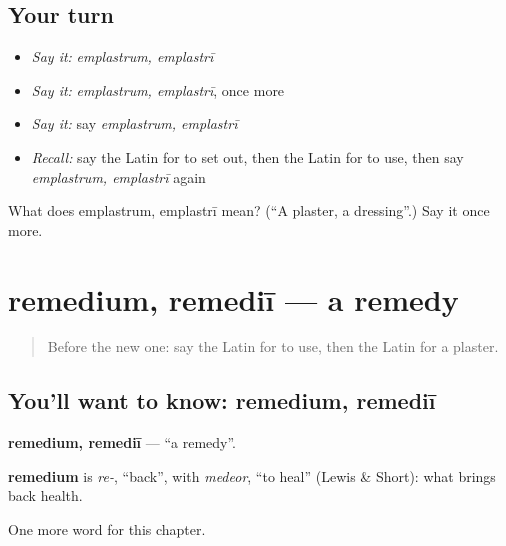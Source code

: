 \subsection*{Your turn}
\begin{itemize}
\raggedright
  \item \emph{Say it:} \emph{emplastrum, emplastrī}
  \item \emph{Say it:} \emph{emplastrum, emplastrī}, once more
  \item \emph{Say it:} say \emph{emplastrum, emplastrī}
  \item \emph{Recall:} say the Latin for to set out, then the Latin for to use, then say \emph{emplastrum, emplastrī} again
\end{itemize}

\begin{tcolorbox}[breakable,colback=teal!4,colframe=teal!35!black,title={Before you move on}]
What does emplastrum, emplastrī mean? (\textquotedblleft{}A plaster, a dressing\textquotedblright{}.) Say it once more.
\end{tcolorbox}
\section[remedium, remediī]{remedium, remediī — a remedy}

\label{lesson:LA-C236-remedium}



\begin{quote}
Before the new one: say the Latin for to use, then the Latin for a plaster.
\end{quote}

\subsection*{You'll want to know: remedium, remediī}
\textbf{remedium, remediī} — \textquotedblleft{}a remedy\textquotedblright{}.

\begin{cousinweb}
\textbf{remedium} is \emph{re-}, \textquotedblleft{}back\textquotedblright{}, with \emph{medeor}, \textquotedblleft{}to heal\textquotedblright{} (Lewis \& Short): what brings back health.
\end{cousinweb}

\begin{grammarlens}[title={What you've built}]
One more word for this chapter.
\end{grammarlens}

